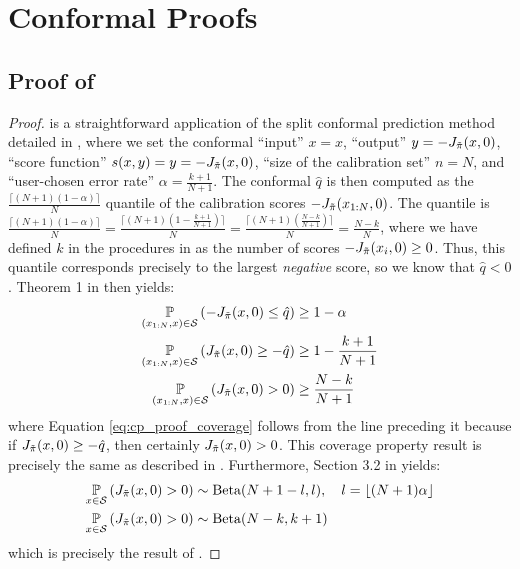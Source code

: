 \section{Conformal Proofs}\label{sec:CP}

\subsection{Proof of \texorpdfstring{}{Conformal Probabilistic Safety Verification Theorem}}\label{apd:conformal_theorem_proof}

\begin{proof}

 is a straightforward application of the split conformal prediction method detailed in \citet{MAL-101}, where we set the conformal ``input'' $x=x$, ``output'' $y=-J_{\Tilde{\pi}}(x,0)$, ``score function'' $s(x,y)=y=-J_{\Tilde{\pi}}(x,0)$, ``size of the calibration set'' $n=N$, and ``user-chosen error rate'' $\alpha=\frac{k+1}{N+1}$.
The conformal $\hat{q}$ is then computed as the $\frac{\lceil(N+1)(1-\alpha)\rceil}{N}$ quantile of the calibration scores $-J_{\Tilde{\pi}}(x_{1:N},0)$.
The quantile is $\frac{\lceil(N+1)(1-\alpha)\rceil}{N} = \frac{\lceil(N+1)(1-\frac{k+1}{N+1})\rceil}{N} = \frac{\lceil(N+1)(\frac{N-k}{N+1})\rceil}{N} = \frac{N-k}{N}$, where we have defined $k$ in the procedures in  as the number of scores $-J_{\Tilde{\pi}}(x_i,0) \ge 0$.
Thus, this quantile corresponds precisely to the largest \textit{negative} score, so we know that $\hat{q} < 0$.
Theorem 1 in \citet{MAL-101} then yields:
\begin{align}
    \underset{ \left( x_{1:N},x \right) \in \mathcal{S} }{\mathbb{P}} \left( -J_{\Tilde{\pi}}(x,0) \le \hat{q}  \right) &\ge 1-\alpha \nonumber \\
    \underset{ \left( x_{1:N},x \right) \in \mathcal{S} }{\mathbb{P}} \left( J_{\Tilde{\pi}}(x,0) \ge -\hat{q}  \right) &\ge 1-\frac{k+1}{N+1} \nonumber \\
    \underset{ \left( x_{1:N},x \right) \in \mathcal{S} }{\mathbb{P}} \left( J_{\Tilde{\pi}}(x,0) > 0  \right) &\ge \frac{N-k}{N+1} \label{eq:cp_proof_coverage}
\end{align}
where Equation \eqref{eq:cp_proof_coverage} follows from the line preceding it because if $J_{\Tilde{\pi}}(x,0) \ge -\hat{q}$, then certainly $J_{\Tilde{\pi}}(x,0) > 0$.
This coverage property result is precisely the same as described in .
Furthermore, Section 3.2 in \citet{MAL-101} yields:
\begin{align}
    \underset{ x \in \mathcal{S} }{\mathbb{P}} \left( J_{\Tilde{\pi}}(x,0) > 0  \right) &\sim \text{Beta}(N+1-l,l),\quad l= \lfloor (N+1)\alpha\rfloor \nonumber \\
    \underset{ x \in \mathcal{S} }{\mathbb{P}} \left( J_{\Tilde{\pi}}(x,0) > 0  \right) &\sim \text{Beta}(N-k,k+1)
\end{align}
which is precisely the result of .
\end{proof}

